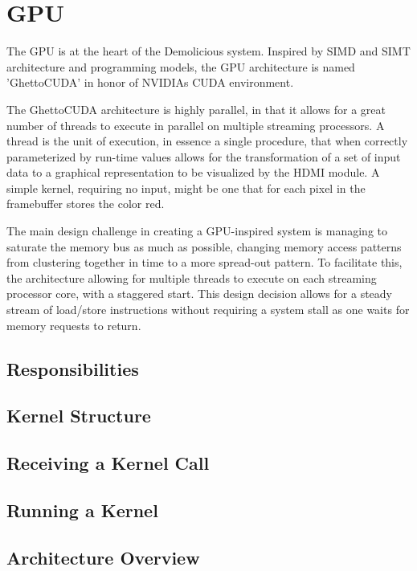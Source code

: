 \chapter{GPU}

The GPU is at the heart of the Demolicious system.
Inspired by SIMD and SIMT architecture and programming models, the GPU architecture is named 'GhettoCUDA' in honor of NVIDIAs CUDA environment.

The GhettoCUDA architecture is highly parallel, in that it allows for a great number of threads to execute in parallel on multiple streaming processors.
A thread is the unit of execution, in essence a single procedure, that when correctly parameterized by run-time values allows for the transformation of a set of input data to a graphical representation to be visualized by the HDMI module.
A simple kernel, requiring no input, might be one that for each pixel in the framebuffer stores the color red.

The main design challenge in creating a GPU-inspired system is managing to saturate the memory bus as much as possible, changing memory access patterns from clustering together in time to a more spread-out pattern.
To facilitate this, the architecture allowing for multiple threads to execute on each streaming processor core, with a staggered start.
This design decision allows for a steady stream of load/store instructions without requiring a system stall as one waits for memory requests to return.

\section{Responsibilities}

\section{Kernel Structure}

\section{Receiving a Kernel Call}

\section{Running a Kernel}

\section{Architecture Overview}

